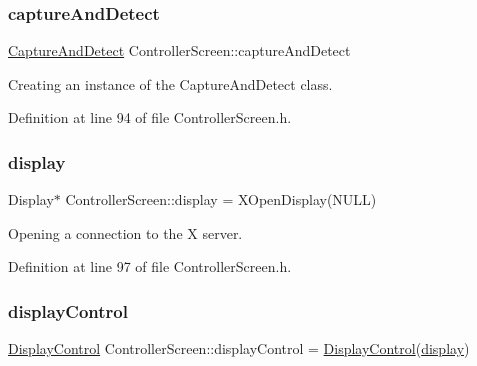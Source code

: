 \subsubsection{\texorpdfstring{capture\+And\+Detect}{captureAndDetect}}
{\footnotesize\ttfamily \hyperlink{class_gestro_1_1_capture_and_detect}{Capture\+And\+Detect} Controller\+Screen\+::capture\+And\+Detect\hspace{0.3cm}{\ttfamily [private]}}



Creating an instance of the Capture\+And\+Detect class. 



Definition at line 94 of file Controller\+Screen.\+h.

\mbox{\label{class_controller_screen_a240495b9e446bc512d8a7498b3f45981}} 
\subsubsection{\texorpdfstring{display}{display}}
{\footnotesize\ttfamily Display$\ast$ Controller\+Screen\+::display = X\+Open\+Display(N\+U\+LL)\hspace{0.3cm}{\ttfamily [private]}}



Opening a connection to the X server. 



Definition at line 97 of file Controller\+Screen.\+h.

\mbox{\label{class_controller_screen_a261f7eb9894dbcfdbddad62ad125e330}} 
\subsubsection{\texorpdfstring{display\+Control}{displayControl}}
{\footnotesize\ttfamily \hyperlink{class_gestro_1_1_display_control}{Display\+Control} Controller\+Screen\+::display\+Control = \hyperlink{class_gestro_1_1_display_control}{Display\+Control}(\hyperlink{class_controller_screen_a240495b9e446bc512d8a7498b3f45981}{display})\hspace{0.3cm}{\ttfamily [private]}}



